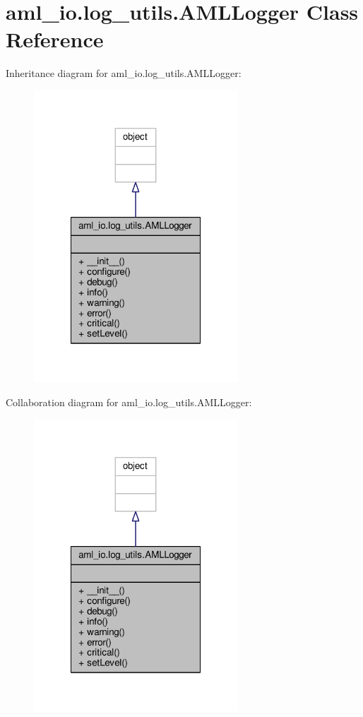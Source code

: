 \hypertarget{classaml__io_1_1log__utils_1_1_a_m_l_logger}{\section{aml\-\_\-io.\-log\-\_\-utils.\-A\-M\-L\-Logger Class Reference}
\label{classaml__io_1_1log__utils_1_1_a_m_l_logger}
}


Inheritance diagram for aml\-\_\-io.\-log\-\_\-utils.\-A\-M\-L\-Logger\-:
\nopagebreak
\begin{figure}[H]
\begin{center}
\leavevmode
\includegraphics[width=216pt]{classaml__io_1_1log__utils_1_1_a_m_l_logger__inherit__graph}
\end{center}
\end{figure}


Collaboration diagram for aml\-\_\-io.\-log\-\_\-utils.\-A\-M\-L\-Logger\-:
\nopagebreak
\begin{figure}[H]
\begin{center}
\leavevmode
\includegraphics[width=216pt]{classaml__io_1_1log__utils_1_1_a_m_l_logger__coll__graph}
\end{center}
\end{figure}
